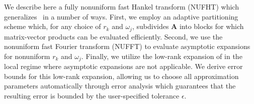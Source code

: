 We describe here a fully nonuniform fast Hankel transform (NUFHT) which
generalizes~\cite{townsend2015fast} in a number of ways. First, we employ an
adaptive partitioning scheme which, for any choice of $r_k$ and $\omega_j$,
subdivides $\bm{A}$ into blocks for which matrix-vector products can be
evaluated efficiently. Second, we use the nonuniform fast Fourier transform
(NUFFT) \citep{dutt1993fast, greengard2004accelerating} to evaluate asymptotic
expansions for nonuniform $r_k$ and $\omega_j$. Finally, we utilize the low-rank
expansion of \cite{wimp1962polynomial} in the local regime where asymptotic
expansions are not applicable. We derive error bounds for this low-rank
expansion, allowing us to choose all approximation parameters automatically
through error analysis which guarantees that the resulting error is bounded by
the user-specified tolerance $\epsilon$. 

